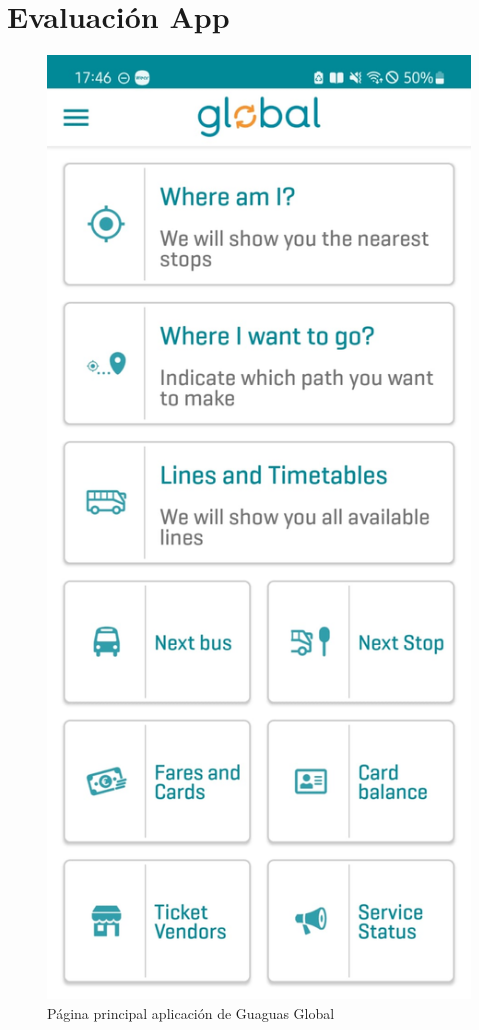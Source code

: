 \documentclass{article}
\begin{document}
    \section{Evaluación App}
        \begin{figure}
            \centerline{\includegraphics[scale=0.18]{globalapp}}
            \caption{Página principal aplicación de Guaguas Global}
            \label{fig:globalapp}
        \end{figure}
\end{document}
